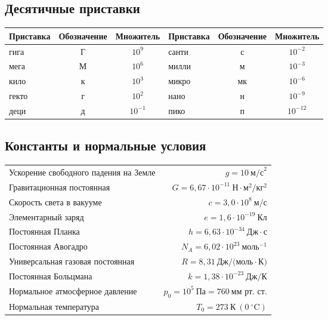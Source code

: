 \begingroup
\footnotesize
\setlength{\parskip}{2pt}
\setlength{\tabcolsep}{3.5pt}
\renewcommand{\arraystretch}{0.92}

\subsection*{Десятичные приставки}
\noindent\begin{tabularx}{\textwidth}{|>{\raggedright\arraybackslash}X|c|c||>{\raggedright\arraybackslash}X|c|c|}
\hline
\textbf{Приставка} & \textbf{Обозначение} & \textbf{Множитель} & \textbf{Приставка} & \textbf{Обозначение} & \textbf{Множитель} \\ \hline
гига  & Г & $10^9$  & санти & с & $10^{-2}$ \\ \hline
мега  & М & $10^6$  & милли & м & $10^{-3}$ \\ \hline
кило  & к & $10^3$  & микро & мк & $10^{-6}$ \\ \hline
гекто & г & $10^2$  & нано  & н & $10^{-9}$ \\ \hline
деци  & д & $10^{-1}$ & пико & п & $10^{-12}$ \\ \hline
\end{tabularx}

\subsection*{Константы и нормальные условия}
\noindent\begin{tabularx}{\linewidth}{>{\raggedright\arraybackslash}X r}
Ускорение свободного падения на Земле & $g = 10~\text{м/с}^2$ \\
Гравитационная постоянная & $G = 6{,}67 \cdot 10^{-11}~\text{Н}\cdot\text{м}^2/\text{кг}^2$ \\
Скорость света в вакууме & $c = 3{,}0 \cdot 10^8~\text{м/с}$ \\
Элементарный заряд & $e = 1{,}6 \cdot 10^{-19}~\text{Кл}$ \\
Постоянная Планка & $h = 6{,}63 \cdot 10^{-34}~\text{Дж}\cdot\text{с}$ \\
Постоянная Авогадро & $N_A = 6{,}02 \cdot 10^{23}~\text{моль}^{-1}$ \\
Универсальная газовая постоянная & $R = 8{,}31~\text{Дж/(моль}\cdot\text{К)}$ \\
Постоянная Больцмана & $k = 1{,}38 \cdot 10^{-23}~\text{Дж/К}$ \\
Нормальное атмосферное давление & $p_0 = 10^5~\text{Па} = 760~\text{мм рт. ст.}$ \\
Нормальная температура & $T_0 = 273~\text{К}~(0~^\circ\text{C})$ \\
\end{tabularx}

